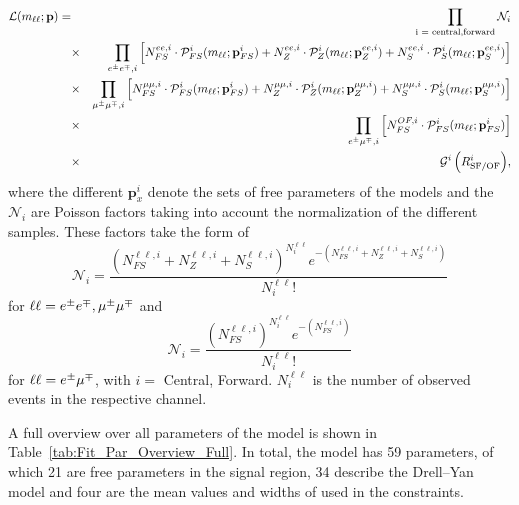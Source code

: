 \begin{eqnarray*}
{\mathcal{L}}(m_{\ell\ell};\mathbf{p}) =&&   \prod_{\text{i = central,forward}} \mathcal{N}_i\\
                        &\times& \prod_{\EE,i}\left[N_{FS}^{ee,i} \cdot {\mathcal{P}}_{FS}^i(m_{\ell\ell};\mathbf{p}_{FS}^i) %
                                                  + N_{Z}^{ee,i} \cdot {\mathcal{P}}_{Z}^i(m_{\ell\ell};\mathbf{p}_{Z}^{ee,i}) %
                                                  + N_{S}^{ee,i} \cdot {\mathcal{P}}_{S}^i(m_{\ell\ell};\mathbf{p}_{S}^{ee,i})\right] \\
                        &\times& \prod_{\MM,i}\left[N_{FS}^{\mu\mu,i} \cdot {\mathcal{P}}_{FS}^i(m_{\ell\ell};\mathbf{p}_{FS}^i) %
                                                  + N_{Z}^{\mu\mu,i} \cdot {\mathcal{P}}_{Z}^i(m_{\ell\ell};\mathbf{p}_{Z}^{\mu\mu,i}) %
                                                  + N_{S}^{\mu\mu,i} \cdot {\mathcal{P}}_{S}^i(m_{\ell\ell};\mathbf{p}_{S}^{\mu\mu,i})\right] \\
                        &\times& \prod_{\EM,i}\left[N_{FS}^{OF,i} \cdot {\mathcal{P}}_{FS}^i(m_{\ell\ell};\mathbf{p}_{FS}^i)\right] \\   
                        &\times& {\mathcal{G}^i\left(\Rsfof^i\right)}, \\
\end{eqnarray*}
where the different $\mathbf{p}^i_{x}$ denote the sets of free parameters of the models and the $\mathcal{N}_i$ are Poisson factors taking into account the normalization of the different samples. These factors take the form of
\begin{equation*}
\mathcal{N}_i = \frac{(N_{FS}^{\ell\ell,i} + N_{Z}^{\ell\ell,i} + N_{S}^{\ell\ell,i})^{N_i^{\ell\ell}} e^{-(N_{FS}^{\ell\ell,i} + N_{Z}^{\ell\ell,i} + N_{S}^{\ell\ell,i})}}{N_i^{\ell\ell}!}
\end{equation*} 
for $\ell\ell = e^\pm e^\mp, \mu^\pm\mu^\mp$ and
\begin{equation*}
\mathcal{N}_i = \frac{(N_{FS}^{\ell\ell,i})^{N_i^{\ell\ell}} e^{-(N_{FS}^{\ell\ell,i})}}{N_i^{\ell\ell}!}
\end{equation*}
for $\ell\ell = e^\pm\mu^\mp$, with $i =$ Central, Forward. $N_i^{\ell\ell}$ is the number of observed events in the respective channel. 

A full overview over all parameters of the model is shown in Table~\ref{tab:Fit_Par_Overview_Full}. In total, the model has 59 parameters, of which 21 are free parameters in the signal region, 34 describe the Drell--Yan model and four are the mean values and widths of \Rsfof used in the constraints. 


